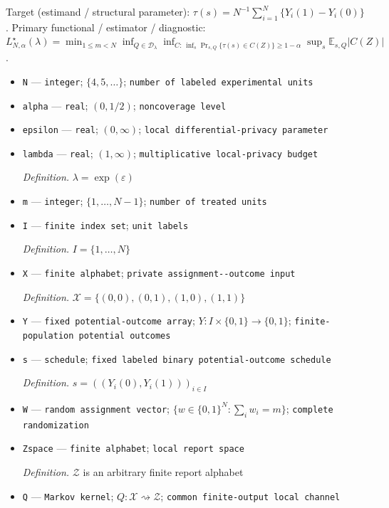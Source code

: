 \documentclass{article}
\begin{document}
Target (estimand / structural parameter): \(\tau(s)=N^{-1}\sum_{i=1}^{N}\{Y_i(1)-Y_i(0)\}\).
Primary functional / estimator / diagnostic: \(L^\star_{N,\alpha}(\lambda)=\min_{1\le m<N}\inf_{Q\in\mathcal D_\lambda}\inf_{C:\,\inf_s\Pr_{s,Q}\{\tau(s)\in C(Z)\}\ge1-\alpha}\sup_s\mathbb E_{s,Q}|C(Z)|\).
\begin{itemize}
  \item \texttt{N} --- \texttt{integer}; \(\{4,5,\ldots\}\); \texttt{number of labeled experimental units}
  \item \texttt{alpha} --- \texttt{real}; \((0,1/2)\); \texttt{noncoverage level}
  \item \texttt{epsilon} --- \texttt{real}; \((0,\infty)\); \texttt{local differential-\allowbreak{}privacy parameter}
  \item \texttt{lambda} --- \texttt{real}; \((1,\infty)\); \texttt{multiplicative local-\allowbreak{}privacy budget}
  \par\smallskip\noindent\emph{Definition.} \(\lambda=\exp(\varepsilon)\)
  \item \texttt{m} --- \texttt{integer}; \(\{1,\ldots,N-1\}\); \texttt{number of treated units}
  \item \texttt{I} --- \texttt{finite index set}; \texttt{unit labels}
  \par\smallskip\noindent\emph{Definition.} \(I=\{1,\ldots,N\}\)
  \item \texttt{X} --- \texttt{finite alphabet}; \texttt{private assignment-\allowbreak{}-\allowbreak{}outcome input}
  \par\smallskip\noindent\emph{Definition.} \(\mathcal X=\{(0,0),(0,1),(1,0),(1,1)\}\)
  \item \texttt{Y} --- \texttt{fixed potential-\allowbreak{}outcome array}; \(Y:I\times\{0,1\}\to\{0,1\}\); \texttt{finite-\allowbreak{}population potential outcomes}
  \item \texttt{s} --- \texttt{schedule}; \texttt{fixed labeled binary potential-\allowbreak{}outcome schedule}
  \par\smallskip\noindent\emph{Definition.} \(s=((Y_i(0),Y_i(1)))_{i\in I}\)
  \item \texttt{W} --- \texttt{random assignment vector}; \(\{w\in\{0,1\}^{N}:\sum_i w_i=m\}\); \texttt{complete randomization}
  \item \texttt{Zspace} --- \texttt{finite alphabet}; \texttt{local report space}
  \par\smallskip\noindent\emph{Definition.} \(\mathcal Z\) is an arbitrary finite report alphabet
  \item \texttt{Q} --- \texttt{Markov kernel}; \(Q:\mathcal X\rightsquigarrow\mathcal Z\); \texttt{common finite-\allowbreak{}output local channel}

\end{itemize}
\end{document}

